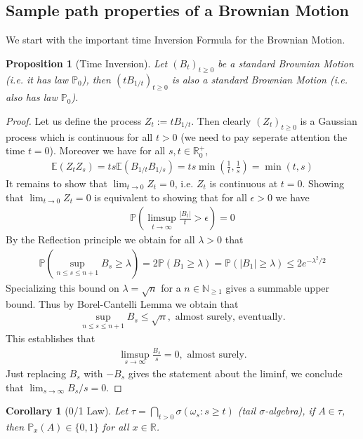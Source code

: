 \documentclass[11pt,a4paper, final]{article}
\newtheorem{prop}{Proposition}[section]
\newtheorem{cor}{Corollary}[section]
\theoremstyle{definition}
\begin{document}
\subsection{Sample path properties of a Brownian Motion}
We start with the important time Inversion Formula for the Brownian Motion.
\begin{prop}[Time Inversion] Let $(B_t)_{t \geq 0}$ be a standard Brownian Motion (i.e. it has law $\mathbb{P}_0$), then $(t B_{1/t})_{t \geq 0}$ is also a standard Brownian Motion (i.e. also has law $\mathbb{P}_0$). 
\end{prop}
\begin{proof}
Let us define the process $Z_t:= t B_{1/t}$. Then clearly $(Z_t)_{t \geq 0}$ is a Gaussian process which is continuous for all $t>0$ (we need to pay seperate attention the time $t=0$). Moreover we have for all $s,t \in \mathbb{R}_0^+$,
\begin{align*}
\mathbb{E}(Z_tZ_s)= ts \mathbb{E}(B_{1/t}B_{1/s}) = ts \min \left( \frac{1}{t}, \frac{1}{s} \right) = \min (t, s ) 
\end{align*}
It remains to show that $\lim_{t \to 0} Z_t=0$, i.e. $Z_t$ is continuous at $t=0$. Showing that $\lim_{t \to 0} Z_t =0$ is equivalent to showing that for all $\epsilon >0$ we have 
\begin{align*}
\mathbb{P}\left( \limsup_{t \to \infty} \frac{|B_t|}{t} > \epsilon \right) =0 
\end{align*}
\newpage
By the Reflection principle we obtain for all $\lambda >0$ that 
\begin{align*}
\mathbb{P}\left( \sup_{n \leq s \leq n+1 }  B_s \geq \lambda \right) = 2 \mathbb{P}( B_1 \geq \lambda) = \mathbb{P}( |B_1| \geq \lambda) \leq 2 e^{- \lambda^2/ 2}
\end{align*}
Specializing this bound on $\lambda= \sqrt{n}$ for a $n \in \mathbb{N}_{\geq 1}$ gives a summable upper bound. Thus by Borel-Cantelli Lemma we obtain that 
\begin{align*}
\sup_{n \leq s \leq n+1} B_s \leq \sqrt{n}, \text{ almost surely, eventually}. 
\end{align*}
This establishes that 
\begin{align*}
\limsup_{s \to \infty} \frac{B_s}{s} = 0, \text{ almost surely}. 
\end{align*}
Just replacing $B_s$ with $-B_s$ gives the statement about the liminf, we conclude that $\lim_{s \to \infty} B_s/s =0. $
\end{proof}
\begin{cor}[0/1 Law] Let $\tau = \displaystyle \bigcap_{t >0} \sigma( \omega_s : s \geq t )$ (tail $\sigma$-algebra), if $A \in \tau$, then $\mathbb{P}_x(A) \in \lbrace 0 , 1 \rbrace$ for all $ x \in \mathbb{R}$. 
\end{cor}
\end{document}

